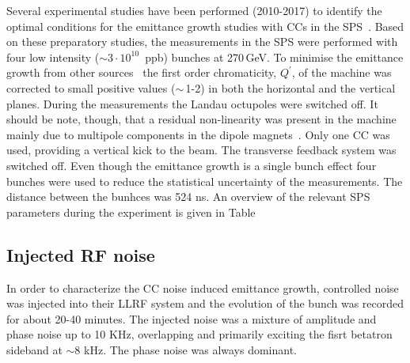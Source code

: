 Several experimental studies have been performed (2010-2017) to identify the optimal conditions for the emittance growth studies with CCs in the SPS~\cite{Calaga:1451286, Antoniou:2649815}. Based on these preparatory studies, the measurements in the SPS were performed with four low intensity ($\sim 3 \cdot 10^{10}$\, ppb) bunches at 270\,GeV. To minimise the emittance growth from other sources~\cite{Antoniou:2649815} the first order chromaticity, $Q^\prime$, of the machine was corrected to small positive values ($\sim$\,1-2) in both the horizontal and the vertical planes. During the measurements the Landau octupoles were switched off. It should be note, though, that a residual non-linearity was present in the machine mainly due to multipole components in the dipole magnets~\cite{Carlà:2664976, Alekou:2640326}. Only one CC was used, providing a vertical kick to the beam. The transverse feedback system was switched off. Even though the emittance growth is a single bunch effect four bunches were used to reduce the statistical uncertainty of the measurements. The distance between the bunhces was 524 ns. An overview of the relevant SPS parameters during the experiment is given in Table%



 \subsection{Injected RF noise} 

 In order to characterize the CC noise induced emittance growth, controlled noise was injected into their LLRF system and the evolution of the bunch was recorded for about 20-40 minutes. The injected noise was a mixture of amplitude and phase noise up to 10 KHz, overlapping and primarily exciting the fisrt betatron sideband at $\sim 8$ kHz. The phase noise was always dominant. 